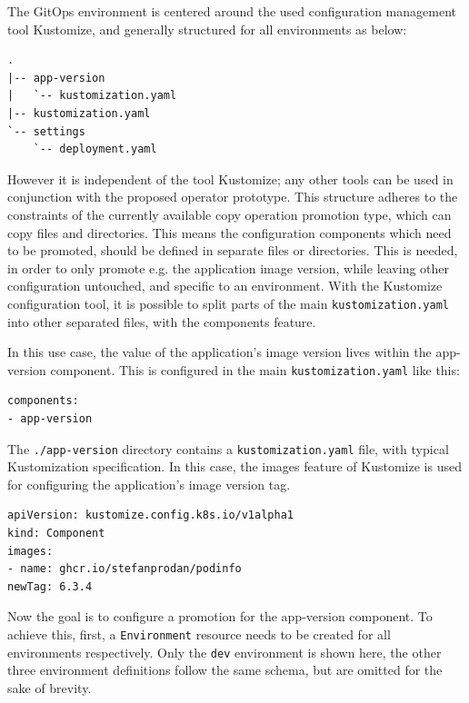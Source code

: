 The GitOps environment is centered around the used configuration management tool
Kustomize, and generally structured for all environments as below:

\begin{lstlisting}
.
|-- app-version
|   `-- kustomization.yaml
|-- kustomization.yaml
`-- settings
    `-- deployment.yaml
\end{lstlisting}

However it is independent of the tool Kustomize;
any other tools can be used in conjunction with the proposed operator prototype.
This structure adheres to the constraints of the currently available
copy operation promotion type, which can copy files and directories.
This means the configuration components which need to be promoted,
should be defined in separate files or directories.
This is needed, in order to only promote e.g. the application image version,
while leaving other configuration untouched, and specific to an environment.
With the Kustomize configuration tool, it is possible to split
parts of the main \lstinline|kustomization.yaml| into other separated files,
with the components feature.

In this use case, the value of the application's image version lives within the 
app-version component. This is configured in the main \lstinline|kustomization.yaml|
like this:

\begin{lstlisting}
components:
- app-version
\end{lstlisting}

The \lstinline|./app-version| directory contains a \lstinline|kustomization.yaml| file,
with typical Kustomization specification.
In this case, the images feature of Kustomize is used for configuring the application's
image version tag.

\begin{lstlisting}
apiVersion: kustomize.config.k8s.io/v1alpha1
kind: Component
images:
- name: ghcr.io/stefanprodan/podinfo
newTag: 6.3.4
\end{lstlisting}

Now the goal is to configure a promotion for the app-version component.
To achieve this, 
first, a \lstinline|Environment| resource needs to be created
for all environments respectively.
Only the \lstinline|dev| environment is shown here,
the other three environment definitions follow the same schema,
but are omitted for the sake of brevity.



